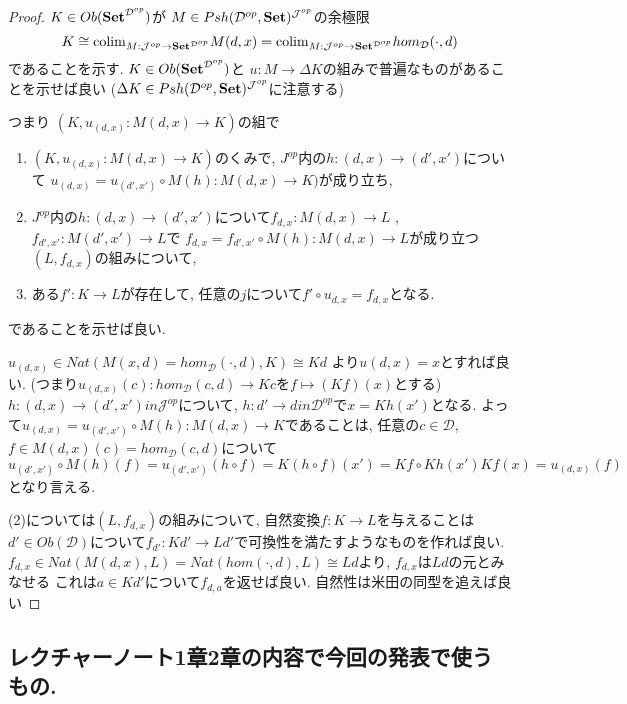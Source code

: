 \documentclass[dvipdfmx,a4paper,11pt]{report}
\newcommand{\colim}{{\rm colim}}
\theoremstyle{definition}
\begin{document}
\begin{proof}
$K \in Ob({\bf Set}^{\mathcal{D}^{op}})$が
$M \in Psh(\mathcal{D}^{op},{\bf Set})^{\mathcal{J}^{op}}$の余極限
$$
K \cong  \colim_{M : \mathcal{J}^{op} \to {\bf Set }^{\mathcal{D}^{op}}}M(d,x)
=\colim_{M : \mathcal{J}^{op} \to {\bf Set }^{\mathcal{D}^{op}}} hom_{\mathcal{D}}(\cdot, d)
$$
であることを示す. 
$K \in Ob({\bf Set}^{\mathcal{D}^{op}})$と $u: M \to \Delta K$の組みで普遍なものがあることを示せば良い
($\Delta K \in Psh(\mathcal{D}^{op},{\bf Set})^{\mathcal{J}^{op}}$に注意する)

つまり
$(K, u_{(d,x)}: M(d,x) \to K)$の組で
\begin{enumerate}
\item $(K, u_{(d,x)}: M(d,x) \to K)$のくみで, $J ^{op}$内の$h : (d,x)\to (d',x')$について
$u_{(d,x)}  = u_{(d',x')} \circ M(h) : M(d ,x) \to K)$が成り立ち, 
\item $J ^{op}$内の$h : (d,x)\to (d',x')$について$f_{d,x} : M(d,x) \to L$
, $f_{d',x'} : M(d',x') \to L$で
$f_{d,x}  = f_{d',x'}\circ M(h) : M(d,x) \to L$が成り立つ$(L, f_{d,x})$の組みについて,
\item ある$f' : K \to L$が存在して, 任意の$j$について$f' \circ u_{d,x} = f_{d,x}$となる.
\end{enumerate}
であることを示せば良い.

$u_{(d,x)} \in Nat(M(x, d)=hom_{\mathcal{D}}(\cdot, d), K) \cong Kd$
より$u{(d,x)} = x$とすれば良い. 
(つまり$u_{(d,x)}(c) : hom_{\mathcal{D}}(c, d) \to  Kc$を$f \mapsto (Kf)(x)$とする)
$h : (d,x)  \to (d',x') in \mathcal{J}^{op} $について, 
$h : d'  \to d in \mathcal{D}^{op}$で$x = Kh(x')$となる. 
よって$u_{(d,x)}  = u_{(d',x')} \circ M(h) : M(d ,x) \to K$であることは, 
任意の$c \in \mathcal{D}$, $f \in M(d ,x)(c) = hom_{\mathcal{D}}(c, d) $について
$$
u_{(d',x')} \circ M(h) (f)
= u_{(d',x')} (h \circ f) 
=K(h \circ f) (x')
=Kf\circ Kh (x')
Kf (x)=u_{(d,x)}(f) 
$$
となり言える. 

(2)については$(L, f_{d,x})$の組みについて, 
自然変換$f : K \to L$を与えることは$d' \in Ob(\mathcal{D})$について$f_{d'} : Kd' \to Ld'$で可換性を満たすようなものを作れば良い. $f_{d,x} \in Nat( M(d,x), L)=Nat( hom(\cdot,d), L)\cong Ld$より, $f_{d,x}$は$Ld$の元とみなせる
これは$a \in Kd'$について$f_{d,a}$を返せば良い. 
自然性は米田の同型を追えば良い
\end{proof}

\subsection{レクチャーノート1章2章の内容で今回の発表で使うもの.}
\end{document}
